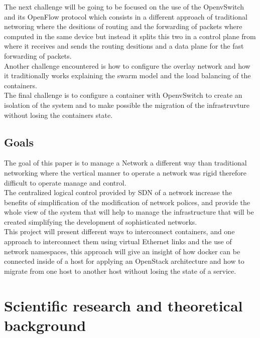 The next challenge will be going to be focused on the use of the OpenvSwitch and its OpenFlow protocol which consists in a different approach of traditional networing where the desitions of routing and the forwarding of packets where computed in the same device but instead it splits this two in a control plane from where it receives and sends the routing desitions and a data plane for the fast forwarding of packets.\\

Another challenge encountered is how to configure the overlay network and how it traditionally works explaining the swarm model and the load balancing of the containers.\\

The final challenge is to configure a container with OpenvSwitch to create an isolation of the system and to make possible the migration of the infrastruvture without losing the containers state.\\
 
\section{Goals}
 
 
The goal of this paper is to manage a Network a different way than traditional networking where the vertical manner to operate a network was rigid therefore difficult to operate manage and control.\\

The centralized logical control provided by SDN of a network increase the benefits of simplification of the modification of network polices, and provide the whole view of the system that will help to manage the infrastructure that will be created simplifying the development of sophisticated networks.\\
 
This project will present different ways to interconnect containers, and one approach to interconnect them using virtual Ethernet links and the use of network namespaces, this approach will give an insight of how docker can be connected inside of a host for applying an OpenStack architecture and how to migrate from one host to another host without losing the state of a service.\\
 
  
\chapter{Scientific research and theoretical background} %

